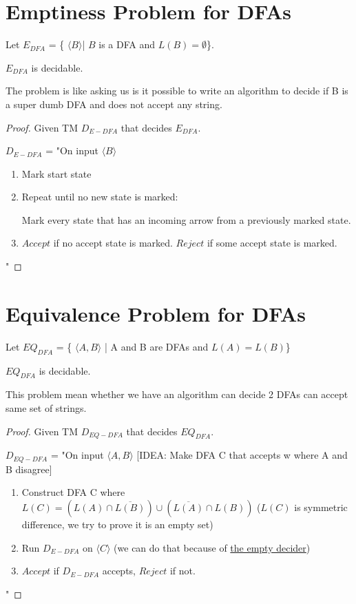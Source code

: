 \section{Emptiness Problem for DFAs}
\begin{theorem}\label{theorem: empty}
    Let \(E_{DFA}\) = \{ \(\langle B \rangle \)| \(B\) is a DFA and \(L(B) = \emptyset\)\}.

    \(E_{DFA}\) is decidable. 
\end{theorem}

The problem is like asking us is it possible to write an algorithm to decide if B is a super dumb DFA and does not accept any string.

\begin{proof}
    Given TM \(D_{E-DFA}\) that decides \(E_{DFA}\).  

    \(D_{E-DFA}\) = "On input \(\langle B \rangle\)  
        \begin{enumerate}
            \item Mark start state
            \item Repeat until no new state is marked:
            
            Mark every state that has an incoming arrow from a previously marked state.
            \item \(Accept\) if no accept state is marked. \(Reject\) if some accept state is marked.  
        \end{enumerate}
        "
\end{proof}

\section{Equivalence Problem for DFAs}
\begin{theorem}
    Let \(EQ_{DFA}\) = \{ \(\langle A, B \rangle\) | A and B are DFAs and \(L(A) = L(B)\)\} 

    \(EQ_{DFA}\) is decidable.
\end{theorem}

This problem mean whether we have an algorithm can decide 2 DFAs can accept same set of strings. 

\begin{proof}
    Given TM \(D_{EQ-DFA}\) that decides \(EQ_{DFA}\).  

    \(D_{EQ-DFA}\) = "On input \(\langle A, B \rangle\) [IDEA: Make DFA C that accepts w where A and B disagree]
    \begin{enumerate}
        \item Construct DFA C where \(L(C)= (L(A) \cap \overline{L(B)}) \cup (\overline{L(A)} \cap L(B))\) (\(L(C)\) is symmetric difference, we try to prove it is an empty set)
        \item Run \(D_{E-DFA}\) on \(\langle C \rangle\) (we can do that because of \hyperref[theorem: empty]{the empty decider})
        \item  \(Accept\) if \(D_{E-DFA}\) accepts, \(Reject\) if not.   
    \end{enumerate}
    "
\end{proof}

